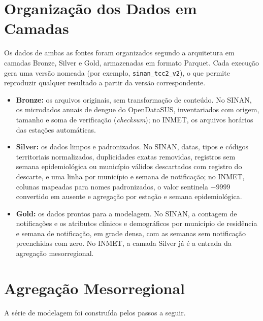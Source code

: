 \begin{apendicesenv}
\section{Organização dos Dados em Camadas}
\label{ap:camadas}

Os dados de ambas as fontes foram organizados segundo a arquitetura em camadas Bronze, Silver e Gold, armazenadas em formato Parquet. Cada execução gera uma versão nomeada (por exemplo, \texttt{sinan\_tcc2\_v2}), o que permite reproduzir qualquer resultado a partir da versão correspondente.

\begin{itemize}
    \item \textbf{Bronze:} os arquivos originais, sem transformação de conteúdo. No SINAN, os microdados anuais de dengue do OpenDataSUS, inventariados com origem, tamanho e soma de verificação (\textit{checksum}); no INMET, os arquivos horários das estações automáticas.
    \item \textbf{Silver:} os dados limpos e padronizados. No SINAN, datas, tipos e códigos territoriais normalizados, duplicidades exatas removidas, registros sem semana epidemiológica ou município válidos descartados com registro do descarte, e uma linha por município e semana de notificação; no INMET, colunas mapeadas para nomes padronizados, o valor sentinela $-9999$ convertido em ausente e agregação por estação e semana epidemiológica.
    \item \textbf{Gold:} os dados prontos para a modelagem. No SINAN, a contagem de notificações e os atributos clínicos e demográficos por município de residência e semana de notificação, em grade densa, com as semanas sem notificação preenchidas com zero. No INMET, a camada Silver já é a entrada da agregação mesorregional.
\end{itemize}

\section{Agregação Mesorregional}
\label{ap:agregacao}

A série de modelagem foi construída pelos passos a seguir.


\end{apendicesenv}
